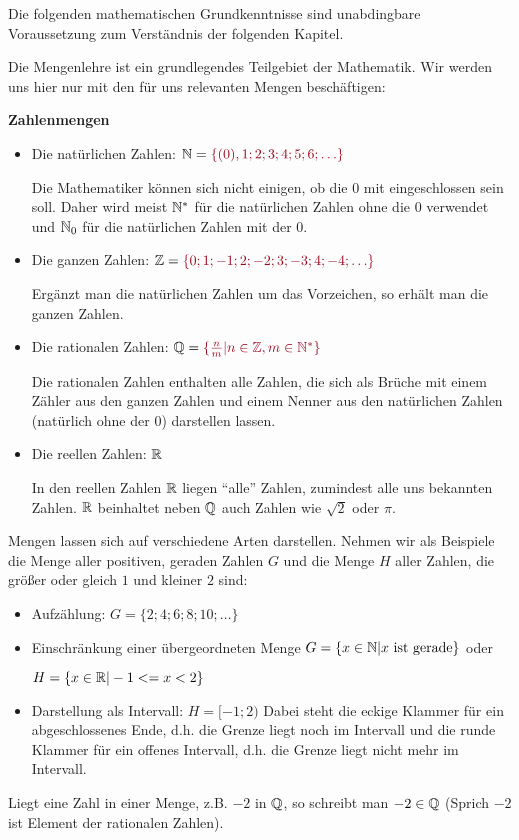 Die folgenden mathematischen Grundkenntnisse sind unabdingbare Voraussetzung zum Verständnis der folgenden Kapitel.

Die Mengenlehre ist ein grundlegendes Teilgebiet der Mathematik. Wir werden uns hier nur mit den für uns relevanten Mengen beschäftigen:
\begin{tcolorbox}
	\textbf{Zahlenmengen}
	\begin{itemize}
		\item Die natürlichen Zahlen: \({\N=\textcolor{loestc}{\{(0), 1; 2; 3; 4; 5; 6; \ldots\}}}\)

        Die Mathematiker können sich nicht einigen, ob die 0 mit eingeschlossen sein soll. Daher wird meist \(\mathbb{N}^*\) für die natürlichen Zahlen ohne die 0 verwendet und \(\mathbb{N}_0\) für die natürlichen Zahlen mit der 0.
		\item Die ganzen Zahlen: \({\Z=\textcolor{loestc}{\{0; 1; -1; 2; -2; 3; -3; 4; -4;\ldots\}}}\)

        Ergänzt man die natürlichen Zahlen um das Vorzeichen, so erhält man die ganzen Zahlen.
		\item Die rationalen Zahlen: \({\Q=\textcolor{loestc}{\{\frac{n}{m}|n\in\Z, m\in\N^*\}}}\)

        Die rationalen Zahlen enthalten alle Zahlen, die sich als Brüche mit einem Zähler aus den ganzen Zahlen und einem Nenner aus den natürlichen Zahlen (natürlich ohne der 0) darstellen lassen.
		\item Die reellen Zahlen: \(\mathbb{R}\)

        In den reellen Zahlen \(\mathbb{R}\) liegen "`alle"' Zahlen, zumindest alle uns bekannten Zahlen. \(\mathbb{R}\) beinhaltet neben \(\mathbb{Q}\) auch Zahlen wie \(\sqrt{2}\) oder \(\pi\).
	\end{itemize}
\end{tcolorbox}
Mengen lassen sich auf verschiedene Arten darstellen. Nehmen wir als Beispiele die Menge aller positiven, geraden Zahlen \(G\) und die Menge \(H\) aller Zahlen, die größer oder gleich \(1\) und kleiner \(2\) sind:
\begin{itemize}
	\item Aufzählung: \({G=\{2; 4; 6; 8; 10;\ldots \}}\)
	\item Einschränkung einer übergeordneten Menge \({G=\{x\in\mathbb{N}|x\text{ ist gerade}\}}\) oder

	\({H=\{x\in\mathbb{R}|-1<=x<2\}}\)
	\item Darstellung als Intervall: \(H=[-1;2)\) Dabei steht die eckige Klammer für ein abgeschlossenes Ende, d.h. die Grenze liegt noch im Intervall und die runde Klammer für ein offenes Intervall, d.h. die Grenze liegt nicht mehr im Intervall.
\end{itemize}
Liegt eine Zahl in einer Menge, z.B. \(-2\) in \(\mathbb{Q}\), so schreibt man \({-2\in\mathbb{Q}}\) (Sprich \(-2\) ist Element der rationalen Zahlen).